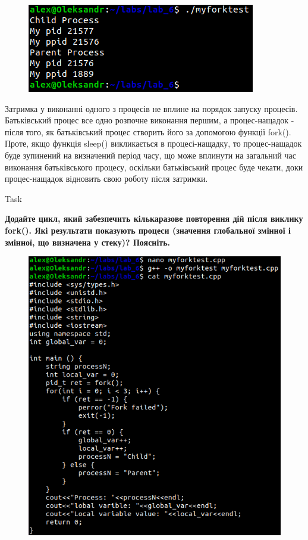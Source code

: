 \documentclass[a4paper,12pt]{article}
\newcommand{\RomanNumeralCaps}[1]{\MakeUppercase{\romannumeral #1}}
\begin{document}
\newpage
    \begin{figure}[h!]
        \begin{minipage}[h]{1\linewidth}
            \centering
            \includegraphics[width=0.6\linewidth]{Prt sc/Figure_4_2.png}  
        \end{minipage}
    \end{figure}
    Затримка у виконанні одного з процесів не вплине на порядок запуску процесів. 
    Батьківський процес все одно розпочне виконання першим, а процес-нащадок - після того, як батьківський процес створить його за допомогою функції fork().
    Проте, якщо функція sleep() викликається в процесі-нащадку, то процес-нащадок буде зупинений на визначений період часу, що може вплинути на загальний час виконання батьківського процесу, оскільки батьківський процес буде чекати, доки процес-нащадок відновить свою роботу після затримки.
    \begin{center}
        \Large{Task \RomanNumeralCaps{5}}
    \end{center}
    \textbf{Додайте цикл, який забезпечить кількаразове повторення дій після виклику fork(). Які результати показують
    процеси (значення глобальної змінної і змінної, що визначена у стеку)? Поясніть.}
    \begin{figure}[h!]
        \begin{minipage}[h]{1\linewidth}
            \centering
            \includegraphics[width=0.6\linewidth]{Prt sc/Figure_5_1.png}  
        \end{minipage}
    \end{figure}
\end{document}
